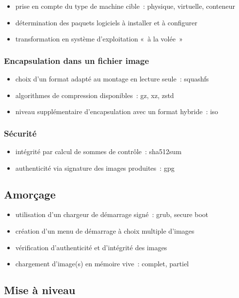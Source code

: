 \documentclass[10pt]{article}
\newenvironment{itmz}{\begin{itemize}
\setlength{\itemsep}{0em}
}{\end{itemize}}
\begin{document}
\begin{itmz}
\item{prise en compte du type de machine cible : physique, virtuelle, conteneur}
\item{détermination des paquets logiciels à installer et à configurer}
\item{transformation en système d’exploitation « à la volée »}
\end{itmz}

\subsubsection{Encapsulation dans un fichier image}

\begin{itmz}
\item{choix d’un format adapté au montage en lecture seule : squashfs}
\item{algorithmes de compression disponibles : gz, xz, zstd}
\item{niveau supplémentaire d’encapsulation avec un format hybride : iso}
\end{itmz}

\subsubsection{Sécurité}

\begin{itmz}
\item{intégrité par calcul de sommes de contrôle : sha512sum}
\item{authenticité via signature des images produites : gpg}
\end{itmz}

\subsection{Amorçage}

\begin{itmz}
\item{utilisation d’un chargeur de démarrage signé : grub, secure boot}
\item{création d’un menu de démarrage à choix multiple d’images}
\item{vérification d’authenticité et d’intégrité des images}
\item{chargement d’image(s) en mémoire vive : complet, partiel}
\end{itmz}

\subsection{Mise à niveau}
\end{document}
